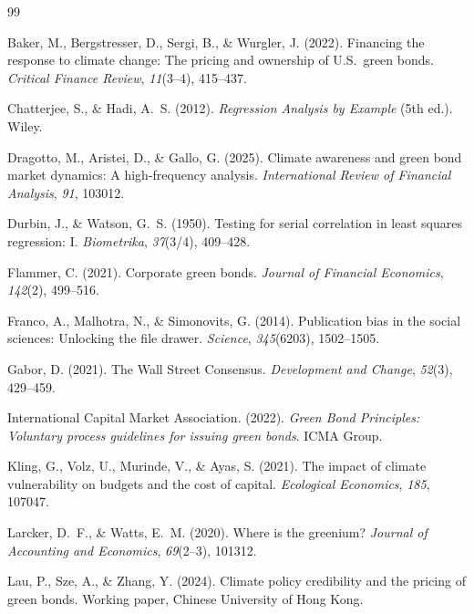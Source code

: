\documentclass[12pt,a4paper]{article}
\begin{document}
\newpage


\begin{thebibliography}{99}

Baker, M., Bergstresser, D., Sergi, B., \& Wurgler, J. (2022).
Financing the response to climate change: The pricing and ownership of U.S.\ green bonds.
\textit{Critical Finance Review}, \textit{11}(3--4), 415--437.

Chatterjee, S., \& Hadi, A.~S. (2012).
\textit{Regression Analysis by Example} (5th ed.).
Wiley.

Dragotto, M., Aristei, D., \& Gallo, G. (2025).
Climate awareness and green bond market dynamics: A high-frequency analysis.
\textit{International Review of Financial Analysis}, \textit{91}, 103012.

Durbin, J., \& Watson, G.~S. (1950).
Testing for serial correlation in least squares regression: I.
\textit{Biometrika}, \textit{37}(3/4), 409--428.

Flammer, C. (2021).
Corporate green bonds.
\textit{Journal of Financial Economics}, \textit{142}(2), 499--516.

Franco, A., Malhotra, N., \& Simonovits, G. (2014).
Publication bias in the social sciences: Unlocking the file drawer.
\textit{Science}, \textit{345}(6203), 1502--1505.

Gabor, D. (2021).
The Wall Street Consensus.
\textit{Development and Change}, \textit{52}(3), 429--459.

International Capital Market Association. (2022).
\textit{Green Bond Principles: Voluntary process guidelines for issuing green bonds}.
ICMA Group.

Kling, G., Volz, U., Murinde, V., \& Ayas, S. (2021).
The impact of climate vulnerability on budgets and the cost of capital.
\textit{Ecological Economics}, \textit{185}, 107047.

Larcker, D.~F., \& Watts, E.~M. (2020).
Where is the greenium?
\textit{Journal of Accounting and Economics}, \textit{69}(2--3), 101312.

Lau, P., Sze, A., \& Zhang, Y. (2024).
Climate policy credibility and the pricing of green bonds.
Working paper, Chinese University of Hong Kong.


\end{thebibliography}
\end{document}
